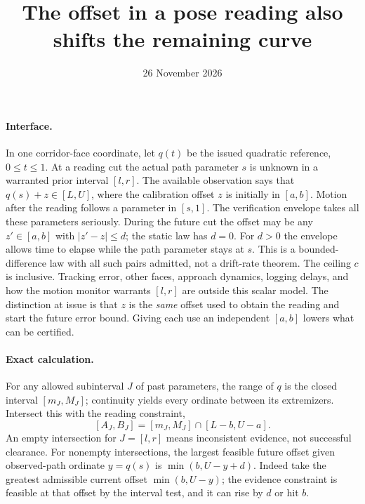 \documentclass[11pt]{article}
\title{The offset in a pose reading also shifts the remaining curve}
\date{26 November 2026}
\begin{document}
\maketitle

\paragraph{Interface.}
In one corridor-face coordinate, let $q(t)$ be the issued quadratic
reference, $0\leq t\leq1$. At a reading cut the actual path parameter
$s$ is unknown in a warranted prior interval $[l,r]$. The available
observation says that $q(s)+z\in[L,U]$, where the calibration offset
$z$ is initially in $[a,b]$. Motion after the reading follows a
parameter in $[s,1]$. The verification envelope takes all these
parameters seriously. During the future cut the offset may be any
$z'\in[a,b]$ with $|z'-z|\leq d$; the static law has $d=0$.
For $d>0$ the envelope allows time to elapse while the path
parameter stays at $s$. This is a bounded-difference law with all
such pairs admitted, not a drift-rate theorem.
The ceiling $c$ is inclusive. Tracking error, other faces, approach
dynamics, logging delays, and how the motion monitor warrants $[l,r]$
are outside this scalar model. The distinction at issue is that $z$
is the \emph{same} offset used to obtain the reading and start the
future error bound. Giving each use an independent $[a,b]$ lowers
what can be certified.

\paragraph{Exact calculation.}
For any allowed subinterval $J$ of past parameters, the range of
$q$ is the closed interval $[m_J,M_J]$; continuity yields every
ordinate between its extremizers. Intersect this with the reading
constraint,
\[
  [A_J,B_J]=[m_J,M_J]\cap[L-b,U-a].
\]
An empty intersection for $J=[l,r]$ means inconsistent evidence,
not successful clearance. For nonempty intersections, the largest
feasible future offset given observed-path ordinate $y=q(s)$ is
$\min(b,U-y+d)$. Indeed take the greatest admissible current
offset $\min(b,U-y)$; the evidence constraint is feasible at that
offset by the interval test, and it can rise by $d$ or hit $b$.
\end{document}
